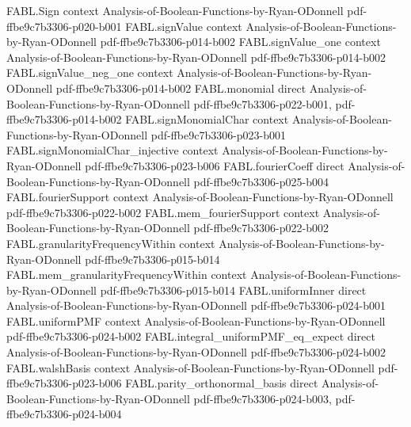 \begin{theorem}
\label{FABL.biasedSiteBasis_apply}
\leanok
{}
\proofstep
  {FABL.Sign}
  {context}
  {Analysis-of-Boolean-Functions-by-Ryan-ODonnell}
  {pdf-ffbe9c7b3306-p020-b001}
\proofstep
  {FABL.signValue}
  {context}
  {Analysis-of-Boolean-Functions-by-Ryan-ODonnell}
  {pdf-ffbe9c7b3306-p014-b002}
\proofstep
  {FABL.signValue_one}
  {context}
  {Analysis-of-Boolean-Functions-by-Ryan-ODonnell}
  {pdf-ffbe9c7b3306-p014-b002}
\proofstep
  {FABL.signValue_neg_one}
  {context}
  {Analysis-of-Boolean-Functions-by-Ryan-ODonnell}
  {pdf-ffbe9c7b3306-p014-b002}
\proofstep
  {FABL.monomial}
  {direct}
  {Analysis-of-Boolean-Functions-by-Ryan-ODonnell}
  {pdf-ffbe9c7b3306-p022-b001,
    pdf-ffbe9c7b3306-p014-b002}
\proofstep
  {FABL.signMonomialChar}
  {context}
  {Analysis-of-Boolean-Functions-by-Ryan-ODonnell}
  {pdf-ffbe9c7b3306-p023-b001}
\proofstep
  {FABL.signMonomialChar_injective}
  {context}
  {Analysis-of-Boolean-Functions-by-Ryan-ODonnell}
  {pdf-ffbe9c7b3306-p023-b006}
\proofstep
  {FABL.fourierCoeff}
  {direct}
  {Analysis-of-Boolean-Functions-by-Ryan-ODonnell}
  {pdf-ffbe9c7b3306-p025-b004}
\proofstep
  {FABL.fourierSupport}
  {context}
  {Analysis-of-Boolean-Functions-by-Ryan-ODonnell}
  {pdf-ffbe9c7b3306-p022-b002}
\proofstep
  {FABL.mem_fourierSupport}
  {context}
  {Analysis-of-Boolean-Functions-by-Ryan-ODonnell}
  {pdf-ffbe9c7b3306-p022-b002}
\proofstep
  {FABL.granularityFrequencyWithin}
  {context}
  {Analysis-of-Boolean-Functions-by-Ryan-ODonnell}
  {pdf-ffbe9c7b3306-p015-b014}
\proofstep
  {FABL.mem_granularityFrequencyWithin}
  {context}
  {Analysis-of-Boolean-Functions-by-Ryan-ODonnell}
  {pdf-ffbe9c7b3306-p015-b014}
\proofstep
  {FABL.uniformInner}
  {direct}
  {Analysis-of-Boolean-Functions-by-Ryan-ODonnell}
  {pdf-ffbe9c7b3306-p024-b001}
\proofstep
  {FABL.uniformPMF}
  {context}
  {Analysis-of-Boolean-Functions-by-Ryan-ODonnell}
  {pdf-ffbe9c7b3306-p024-b002}
\proofstep
  {FABL.integral_uniformPMF_eq_expect}
  {direct}
  {Analysis-of-Boolean-Functions-by-Ryan-ODonnell}
  {pdf-ffbe9c7b3306-p024-b002}
\proofstep
  {FABL.walshBasis}
  {context}
  {Analysis-of-Boolean-Functions-by-Ryan-ODonnell}
  {pdf-ffbe9c7b3306-p023-b006}
\proofstep
  {FABL.parity_orthonormal_basis}
  {direct}
  {Analysis-of-Boolean-Functions-by-Ryan-ODonnell}
  {pdf-ffbe9c7b3306-p024-b003,
    pdf-ffbe9c7b3306-p024-b004}

\end{theorem}
